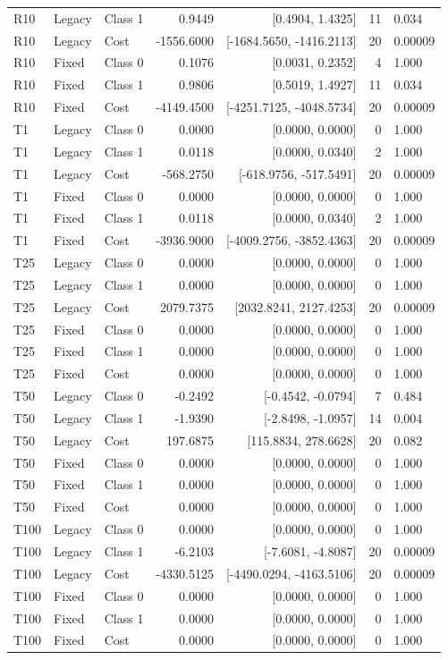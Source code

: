 \documentclass[10pt,a4paper]{article}
\renewcommand{\arraystretch}{1.15}
\begin{document}
\begin{longtable}{lllrrrl}
R10 & Legacy & Class 1 & 0.9449 & [0.4904, 1.4325] & 11 & 0.034 \\
R10 & Legacy & Cost & -1556.6000 & [-1684.5650, -1416.2113] & 20 & 0.00009 \\
R10 & Fixed & Class 0 & 0.1076 & [0.0031, 0.2352] & 4 & 1.000 \\
R10 & Fixed & Class 1 & 0.9806 & [0.5019, 1.4927] & 11 & 0.034 \\
R10 & Fixed & Cost & -4149.4500 & [-4251.7125, -4048.5734] & 20 & 0.00009 \\
T1 & Legacy & Class 0 & 0.0000 & [0.0000, 0.0000] & 0 & 1.000 \\
T1 & Legacy & Class 1 & 0.0118 & [0.0000, 0.0340] & 2 & 1.000 \\
T1 & Legacy & Cost & -568.2750 & [-618.9756, -517.5491] & 20 & 0.00009 \\
T1 & Fixed & Class 0 & 0.0000 & [0.0000, 0.0000] & 0 & 1.000 \\
T1 & Fixed & Class 1 & 0.0118 & [0.0000, 0.0340] & 2 & 1.000 \\
T1 & Fixed & Cost & -3936.9000 & [-4009.2756, -3852.4363] & 20 & 0.00009 \\
T25 & Legacy & Class 0 & 0.0000 & [0.0000, 0.0000] & 0 & 1.000 \\
T25 & Legacy & Class 1 & 0.0000 & [0.0000, 0.0000] & 0 & 1.000 \\
T25 & Legacy & Cost & 2079.7375 & [2032.8241, 2127.4253] & 20 & 0.00009 \\
T25 & Fixed & Class 0 & 0.0000 & [0.0000, 0.0000] & 0 & 1.000 \\
T25 & Fixed & Class 1 & 0.0000 & [0.0000, 0.0000] & 0 & 1.000 \\
T25 & Fixed & Cost & 0.0000 & [0.0000, 0.0000] & 0 & 1.000 \\
T50 & Legacy & Class 0 & -0.2492 & [-0.4542, -0.0794] & 7 & 0.484 \\
T50 & Legacy & Class 1 & -1.9390 & [-2.8498, -1.0957] & 14 & 0.004 \\
T50 & Legacy & Cost & 197.6875 & [115.8834, 278.6628] & 20 & 0.082 \\
T50 & Fixed & Class 0 & 0.0000 & [0.0000, 0.0000] & 0 & 1.000 \\
T50 & Fixed & Class 1 & 0.0000 & [0.0000, 0.0000] & 0 & 1.000 \\
T50 & Fixed & Cost & 0.0000 & [0.0000, 0.0000] & 0 & 1.000 \\
T100 & Legacy & Class 0 & 0.0000 & [0.0000, 0.0000] & 0 & 1.000 \\
T100 & Legacy & Class 1 & -6.2103 & [-7.6081, -4.8087] & 20 & 0.00009 \\
T100 & Legacy & Cost & -4330.5125 & [-4490.0294, -4163.5106] & 20 & 0.00009 \\
T100 & Fixed & Class 0 & 0.0000 & [0.0000, 0.0000] & 0 & 1.000 \\
T100 & Fixed & Class 1 & 0.0000 & [0.0000, 0.0000] & 0 & 1.000 \\
T100 & Fixed & Cost & 0.0000 & [0.0000, 0.0000] & 0 & 1.000 \\
\end{longtable}
\normalsize\renewcommand{\arraystretch}{1.15}
\end{document}
